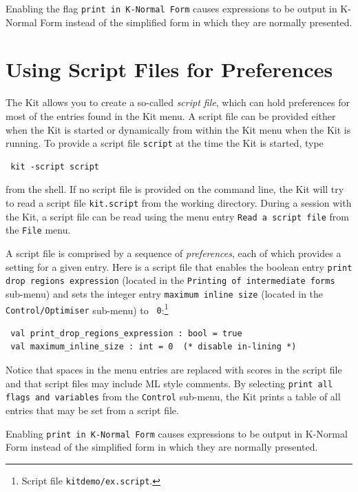 \documentclass[12pt]{book}
\begin{document}
Enabling the flag
%
\texttt{print in K-Normal Form} causes
expressions to be output in K-Normal Form instead of the simplified
form in which they are normally presented.

\section{Using Script Files for Preferences}
\label{scriptfiles.sec}
The Kit allows you to create a so-called 
%
{\em script file}, which can hold preferences for most of the entries
found in the Kit menu. A script file can be provided either when the
Kit is started or dynamically from within the Kit menu when the Kit is
running. To provide a script file {\tt script} at the time the Kit is
started, type
\begin{verbatim}
 kit -script script
\end{verbatim}
from the shell. If no script file is provided on the command line, the
Kit will try to read a script file
%
{\tt kit.script} from the working directory. During a session with the
Kit, a script file can be read using the menu entry {\tt Read a script
  file} from the {\tt File} menu.

A script file is comprised by a sequence of 
%
{\em preferences}, each of which provides a setting for a given entry.
Here is a script file that enables the boolean entry {\tt print drop
  regions expression} (located in the {\tt Printing of intermediate
  forms} sub-menu) and sets the integer entry {\tt maximum inline
  size} (located in the {\tt Control/Optimiser} sub-menu) to {\tt
  0}:\footnote{Script file {\tt kitdemo/ex.script}.}
\begin{verbatim}
 val print_drop_regions_expression : bool = true 
 val maximum_inline_size : int = 0  (* disable in-lining *)
\end{verbatim}
Notice that spaces in the menu entries are replaced with scores in the
script file and that script files may include ML style comments. By
selecting {\tt print all flags and variables} from the {\tt Control}
sub-menu, the Kit prints a table of all entries that may be set from a
script file.

Enabling 
%
%
\texttt{print in K-Normal Form} causes expressions to be output in
K-Normal Form instead of the simplified form in which they are
normally presented.
\end{document}
